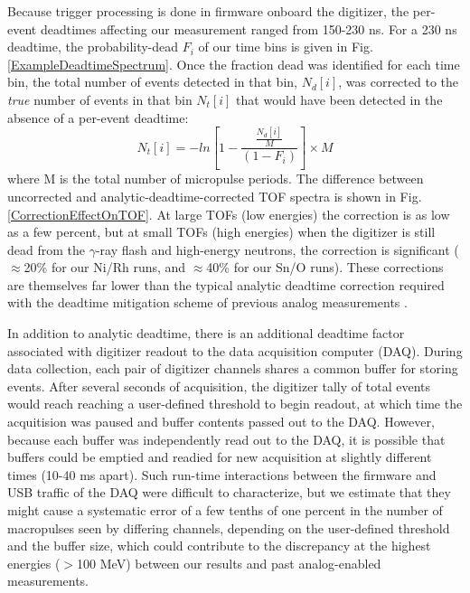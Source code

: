 \documentclass[twocolumn,secnumarabic,amssymb, nobibnotes, aps, prl,
superscriptaddress, nobalancelastpage]{revtex4}
\begin{document}
Because trigger processing is done in firmware onboard the digitizer,
the per-event deadtimes affecting our
measurement ranged from 150-230 ns. For a 230 ns deadtime, the probability-dead
$F_{i}$ of our time bins is given in Fig.
\ref{ExampleDeadtimeSpectrum}.
Once the fraction dead was identified for each time bin, the total number of
events detected in that bin, $N_{d}[i]$, was corrected to the \textit{true}
number of events in that bin $N_{t}[i]$ that would have been detected in the
absence of a
per-event deadtime:
\begin{equation}
    N_{t}[i] = -ln\left[1-\frac{\frac{N_{d}[i]}{M}}{(1-F_{i})}\right]\times M
\end{equation}
where M is the total number of micropulse periods. The difference between
uncorrected and analytic-deadtime-corrected TOF spectra is shown in Fig.
\ref{CorrectionEffectOnTOF}. At large TOFs (low energies) the correction is as low as a
few percent, but at small TOFs (high energies) when the digitizer is still dead
from the $\gamma$-ray flash and high-energy neutrons, the correction is significant
($\approx$20\% for our Ni/Rh runs, and $\approx$40\% for our Sn/O runs). These 
corrections are themselves far lower than the typical
analytic deadtime correction required with the deadtime mitigation scheme of
previous analog measurements \cite{Finlay1993,
Abfalterer2001}. %

In addition to analytic deadtime, there is an additional deadtime factor associated with 
digitizer readout to the data acquisition computer (DAQ). During data
collection, each pair of digitizer channels shares a common buffer for storing events.
After several seconds of acquisition, the digitizer tally of total events would
reach reaching a user-defined threshold to begin readout, at which time the
acquitision was paused and buffer contents passed out to the DAQ. However,
because each buffer was independently read out to the DAQ, it is possible that buffers
could be emptied and readied for new acquisition at slightly different times
(10-40 ms apart). Such run-time interactions between the firmware and USB
traffic of the DAQ were difficult to characterize, but we estimate that they might cause a 
systematic error of a few tenths of one
percent in the number of macropulses seen by differing channels, depending on the user-defined 
threshold and the buffer size, which could contribute to the discrepancy at the
highest energies ($>$100 MeV) between our results and past analog-enabled
measurements. 
\end{document}
